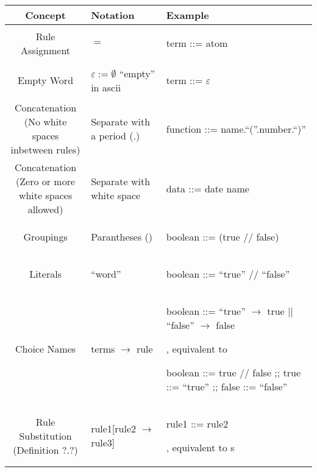 \begin{center}
  \begin{tabular}{ | c | p{2cm} | p{6cm} | }
  \hline
  \textbf{Concept} & \textbf{Notation} & \textbf{Example} \\
  \hline
	Rule Assignment & $=$ & \begin{bnf} term ::= atom\end{bnf}\\
  \hline
  Empty Word & \makecell{$\varepsilon := \emptyset$ \\ ``empty'' in ascii} & \begin{bnf} term ::= $\varepsilon$ \end{bnf} \\
    \hline
  \makecell{Concatenation \\ (No white spaces \\ inbetween rules)} & \makecell{Separate with \\  a period (.)}&  \begin{bnf} function ::= name.``(''.number.``)''\end{bnf} \\
  \hline
  \makecell{Concatenation \\ (Zero or more \\ white spaces allowed)} & \makecell{Separate with \\ white space} & \begin{bnf} data ::= date name\end{bnf} \\
  \hline
  Groupings & Parantheses () & \begin{bnf} boolean ::= (true // false)\end{bnf} \\
  \hline
  Literals & ``word'' & \begin{bnf} boolean ::= ``true'' // ``false'' \end{bnf} \\
  \hline
  Choice Names & terms $\to$ rule & \makecell{\begin{bnf} boolean ::= ``true'' $\to$ true || ``false'' $\to$ false \end{bnf}, \\ equivalent to \\ \begin{bnf}  boolean ::= true // false ;; true ::= ``true'' ;; false ::= ``false'' \end{bnf}} \\
  \hline
  \makecell{Rule Substitution \\ (Definition ?.?)} & rule1[rule2 $\to$ rule3] & \makecell{\begin{bnf} rule1 ::= rule2 \end{bnf}, \\ equivalent to \\ s } \\
    \hline
  \end{tabular}
  \end{center}

